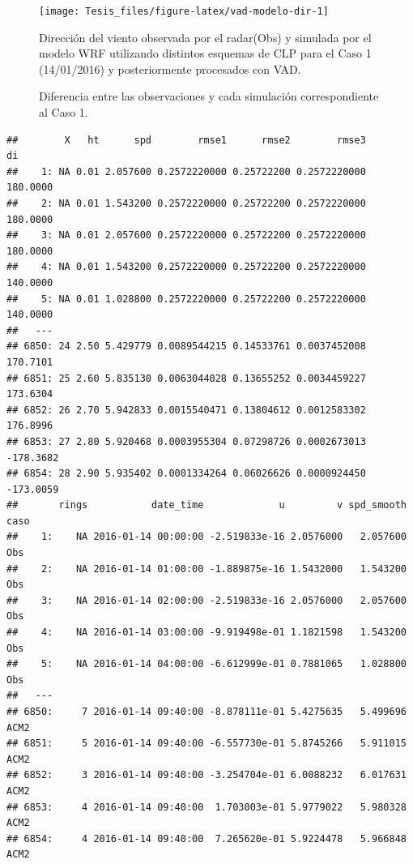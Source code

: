 \documentclass[12pt,spanish,oneside]{book}
\begin{document}
\begin{figure}

{\centering \texttt{[image: Tesis\_files/figure-latex/vad-modelo-dir-1]} 

}

\caption{Dirección del viento observada por el radar(Obs) y simulada por el modelo WRF utilizando distintos esquemas de CLP para el Caso 1 (14/01/2016) y posteriormente procesados con VAD. \label{modelo-dir}}\label{fig:vad-modelo-dir}
\end{figure}

\begin{figure}
\caption{Diferencia entre las observaciones y cada simulación  correspondiente al Caso 1. \label{dif}}\label{fig:diferencia}
\end{figure}

\begin{verbatim}
##        X   ht      spd        rmse1      rmse2        rmse3        di
##    1: NA 0.01 2.057600 0.2572220000 0.25722200 0.2572220000  180.0000
##    2: NA 0.01 1.543200 0.2572220000 0.25722200 0.2572220000  180.0000
##    3: NA 0.01 2.057600 0.2572220000 0.25722200 0.2572220000  180.0000
##    4: NA 0.01 1.543200 0.2572220000 0.25722200 0.2572220000  140.0000
##    5: NA 0.01 1.028800 0.2572220000 0.25722200 0.2572220000  140.0000
##   ---                                                                
## 6850: 24 2.50 5.429779 0.0089544215 0.14533761 0.0037452008  170.7101
## 6851: 25 2.60 5.835130 0.0063044028 0.13655252 0.0034459227  173.6304
## 6852: 26 2.70 5.942833 0.0015540471 0.13804612 0.0012583302  176.8996
## 6853: 27 2.80 5.920468 0.0003955304 0.07298726 0.0002673013 -178.3682
## 6854: 28 2.90 5.935402 0.0001334264 0.06026626 0.0000924450 -173.0059
##       rings           date_time             u         v spd_smooth caso
##    1:    NA 2016-01-14 00:00:00 -2.519833e-16 2.0576000   2.057600  Obs
##    2:    NA 2016-01-14 01:00:00 -1.889875e-16 1.5432000   1.543200  Obs
##    3:    NA 2016-01-14 02:00:00 -2.519833e-16 2.0576000   2.057600  Obs
##    4:    NA 2016-01-14 03:00:00 -9.919498e-01 1.1821598   1.543200  Obs
##    5:    NA 2016-01-14 04:00:00 -6.612999e-01 0.7881065   1.028800  Obs
##   ---                                                                  
## 6850:     7 2016-01-14 09:40:00 -8.878111e-01 5.4275635   5.499696 ACM2
## 6851:     5 2016-01-14 09:40:00 -6.557730e-01 5.8745266   5.911015 ACM2
## 6852:     3 2016-01-14 09:40:00 -3.254704e-01 6.0088232   6.017631 ACM2
## 6853:     4 2016-01-14 09:40:00  1.703003e-01 5.9779022   5.980328 ACM2
## 6854:     4 2016-01-14 09:40:00  7.265620e-01 5.9224478   5.966848 ACM2
\end{verbatim}
\end{document}
